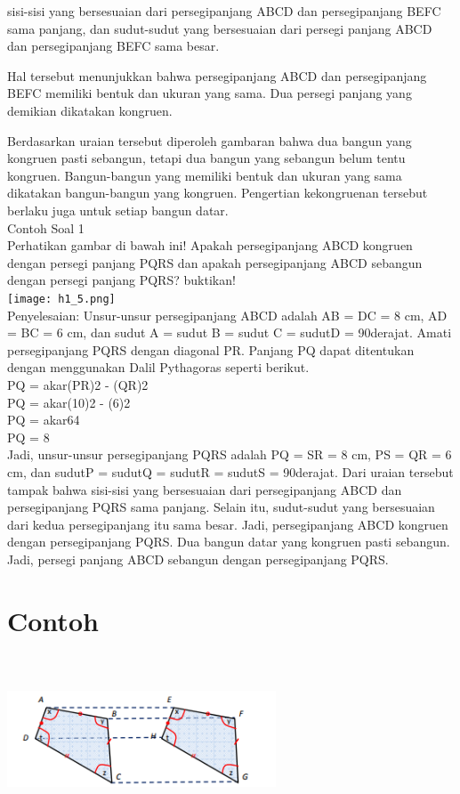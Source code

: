 \documentclass[11pt,fleqn]{book} %
\begin{document}
sisi-sisi yang bersesuaian dari persegipanjang ABCD dan persegipanjang BEFC sama panjang, dan
sudut-sudut yang bersesuaian dari persegi panjang ABCD dan persegipanjang BEFC sama besar.

Hal tersebut menunjukkan bahwa persegipanjang ABCD dan persegipanjang BEFC memiliki bentuk dan ukuran yang sama. Dua persegi panjang yang demikian dikatakan kongruen.

Berdasarkan uraian tersebut diperoleh gambaran bahwa dua bangun yang kongruen pasti sebangun, tetapi dua bangun yang sebangun belum tentu kongruen. Bangun-bangun yang memiliki bentuk dan ukuran yang sama dikatakan bangun-bangun yang kongruen. Pengertian kekongruenan tersebut berlaku juga untuk setiap bangun datar.\\


Contoh Soal 1\\
Perhatikan gambar di bawah ini! Apakah persegipanjang ABCD kongruen dengan persegi panjang PQRS dan  apakah persegipanjang ABCD sebangun dengan persegi panjang PQRS? buktikan!\\
 \texttt{[image: h1\_5.png]}\\
Penyelesaian:
Unsur-unsur persegipanjang ABCD adalah AB = DC = 8 cm, AD = BC = 6 cm, dan sudut A = sudut B = sudut C = sudutD = 90derajat. Amati persegipanjang PQRS dengan diagonal PR. Panjang PQ dapat ditentukan dengan menggunakan Dalil Pythagoras seperti berikut.\\
PQ = akar(PR)2 - (QR)2\\
PQ = akar(10)2 - (6)2\\
PQ = akar64\\
PQ = 8\\

Jadi, unsur-unsur persegipanjang PQRS adalah PQ = SR = 8 cm, PS = QR = 6 cm, dan sudutP = sudutQ = sudutR = sudutS = 90derajat.  Dari uraian tersebut tampak bahwa sisi-sisi yang bersesuaian dari persegipanjang ABCD dan persegipanjang PQRS sama panjang. Selain itu, sudut-sudut yang bersesuaian dari kedua persegipanjang itu sama besar. Jadi, persegipanjang ABCD kongruen dengan persegipanjang PQRS. Dua bangun datar yang kongruen pasti sebangun. Jadi, persegi panjang ABCD sebangun dengan persegipanjang PQRS.


\section{Contoh}
\includegraphics[width = 8cm, height= 5cm]{Pictures/1.png}
 
\end{document}
